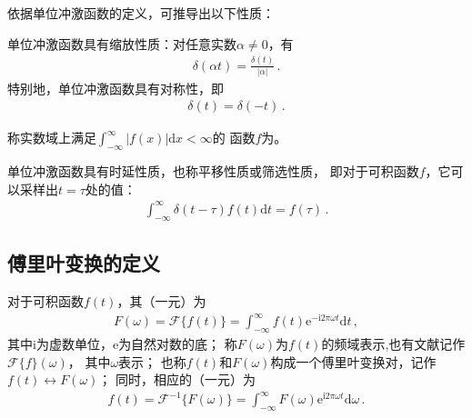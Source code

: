 依据单位冲激函数的定义，可推导出以下性质：
\begin{theorem}\label{theorem:7.ex01.symmetry}
    单位冲激函数具有缩放性质：对任意实数$\alpha\neq0$，有
    \begin{align}
        \delta(\alpha t)=\frac{\delta(t)}{|\alpha|}\, .
    \end{align}
    特别地，单位冲激函数具有对称性，即
    \begin{align}
        \delta(t)=\delta(-t)\, .
    \end{align}
\end{theorem}
\begin{definition}
    称实数域上满足$\displaystyle\int_{-\infty}^{\infty}|f(x)|\mathrm{d}x<\infty$的
    函数$f$为。
\end{definition}
\begin{theorem}\label{theorem:7.ex01.1}
    单位冲激函数具有时延性质，也称平移性质或筛选性质，
    即对于可积函数$f$，它可以采样出$t=\tau$处的值：
    \begin{align}
        \int_{-\infty}^{\infty}\delta(t-\tau)f(t)\mathrm{d}t=f(\tau)\, .
    \end{align}
\end{theorem}
\subsection{傅里叶变换的定义}\label{sub:傅里叶变换的定义}
\begin{definition}
    对于可积函数$f(t)$，其（一元）为
    \begin{align}
        F(\omega)=\mathcal{F}\{f(t)\}=\int_{-\infty}^{\infty}f(t)\mathrm{e}^{-\mathrm{i}2\pi\omega t}\mathrm{d}t\, ,
    \end{align}
    其中$\mathrm{i}$为虚数单位，$\mathrm{e}$为自然对数的底；
    称$F(\omega)$为$f(t)$的频域表示,也有文献记作$\mathcal{F}\{f\}(\omega)$，
    其中$\omega$表示；
    也称$f(t)$和$F(\omega)$构成一个傅里叶变换对，记作$f(t)\leftrightarrow F(\omega)$；
    同时，相应的（一元）为
    \begin{align}\label{eq:7.ex01.inverseFourier}
        f(t)=\mathcal{F}^{-1}\{F(\omega)\}=\int_{-\infty}^{\infty}F(\omega)\mathrm{e}^{\mathrm{i}2\pi\omega t}\mathrm{d}\omega\, .
    \end{align}
\end{definition}

